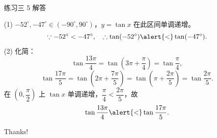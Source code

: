 \documentclass[10pt,aspectratio=169,serif]{beamer}
\begin{document}
\begin{frame}[t]{练习三 5 解答}
\begin{tcolorbox}[colback=orange!10,colframe=orange,title=\textbf{解}]
(1) $-52^\circ,-47^\circ\in\left(-90^\circ,90^\circ\right)$，$y=\tan x$ 在此区间单调递增。
\[\because -52^\circ<-47^\circ,\quad\therefore \tan(-52^\circ)\alert{<}\tan(-47^\circ).
\]
(2) 化简：
\[
\tan\frac{13\pi}{4}=\tan\!\left(3\pi+\frac{\pi}{4}\right)=\tan\frac{\pi}{4},
\]
\[
\tan\frac{17\pi}{5}=\tan\!\left(2\pi+\frac{7\pi}{5}\right)=\tan\!\left(\pi+\frac{2\pi}{5}\right)=\tan\frac{2\pi}{5}.
\]
在 $\left(0,\dfrac{\pi}{2}\right)$ 上 $\tan x$ 单调递增，$\dfrac{\pi}{4}<\dfrac{2\pi}{5}$，故
\[
\tan\frac{13\pi}{4}\alert{<}\tan\frac{17\pi}{5}.
\]
\end{tcolorbox}
\end{frame}

\begin{frame}[c]
  \begin{center}
    {\Huge\calligra Thanks!}
  \end{center}
\end{frame}
\end{document}
